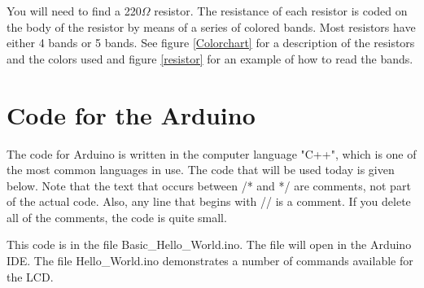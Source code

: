 \documentclass[]{article}
\begin{document}
You will need to find a 220$\Omega$ resistor.  The resistance of each resistor is coded on the body of the resistor by means of a series of colored bands.  Most resistors have either 4 bands or 5 bands.  See figure \ref{Colorchart} for a description of the resistors and the colors used and figure \ref{resistor} for an example of how to read the bands.


\section{Code for the Arduino}

The code for Arduino is written in the computer language "C++", which is one of the most common languages in use.  The code that will be used today is given below.  Note that the text that occurs between 
/* 
and 
*/
are comments, not part of the actual code.  Also, any line that begins with // is a comment. If you delete all of the comments, the code is quite small.

This code is in the file Basic\_Hello\_World.ino.  The file will open in the Arduino IDE.  The file Hello\_World.ino demonstrates a number of commands available for the LCD.  
\bigskip
\end{document}

